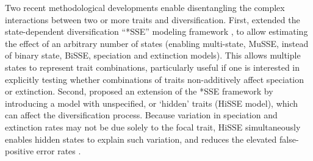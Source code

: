 Two recent methodological developments enable disentangling the complex interactions between two or more traits and diversification.
First, \citet{fitzjohn_2012} extended the state-dependent diversification ``*SSE'' modeling framework \citep{maddison_2007}, to allow estimating the effect of an arbitrary number of states (enabling multi-state, MuSSE, instead of binary state, BiSSE, speciation and extinction models).
This allows multiple states to represent trait combinations, particularly useful if one is interested in explicitly testing whether combinations of traits non-additively affect speciation or extinction. 
Second, \citet{beaulieu_2016}  proposed an extension of the *SSE framework by introducing a model with unspecified, or `hidden' traits (HiSSE model), which can affect the diversification process.
Because variation in speciation and extinction rates may not be due solely to the focal trait, HiSSE simultaneously enables hidden states to explain such variation, and reduces the elevated false-positive error rates \citep{rabosky_2015}.
